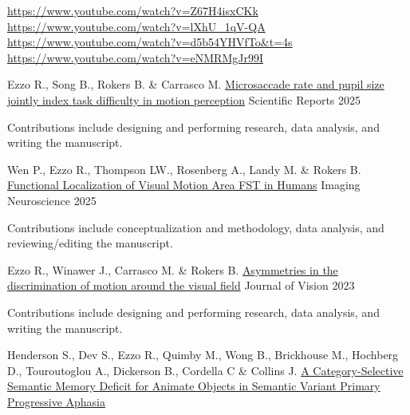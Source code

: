 \newpage
\urldef{\urltoaaic}\url{https://www.youtube.com/watch?v=Z67H4isxCKk}
\urldef{\urltocns}\url{https://www.youtube.com/watch?v=lXhU_1qV-QA}
\urldef{\urltoecvp}\url{https://www.youtube.com/watch?v=d5b54YHVfTo&t=4s}
\urldef{\urltovss}\url{https://www.youtube.com/watch?v=eNMRMgJr99I}
\begin{cventries}
  \cventry
    {Ezzo R., Song B., Rokers B. \& Carrasco M.}
    {\href{https://www.nature.com/articles/s41598-025-04748-0}{Microsaccade rate and pupil size jointly index task difficulty in motion perception}}
    {Scientific Reports}
    {2025}
    {
      \begin{cvitems}
        \item {Contributions include designing and performing research, data analysis, and writing the manuscript.}
      \end{cvitems}
    }
\cventry
    {Wen P., Ezzo R., Thompson LW., Rosenberg A., Landy M. \& Rokers B.}
    {\href{https://pmc.ncbi.nlm.nih.gov/articles/PMC11430136}{Functional Localization of Visual Motion Area FST in Humans}}
    {Imaging Neuroscience}
    {2025}
    {
      \begin{cvitems}
        \item {Contributions include conceptualization and methodology, data analysis, and reviewing/editing the manuscript.}
      \end{cvitems}
    }
  \cventry
    {Ezzo R., Winawer J., Carrasco M.  \& Rokers B.}
    {\href{https://jov.arvojournals.org/article.aspx?articleid=2785488}{Asymmetries in the discrimination of motion around the visual field}}
    {Journal of Vision}
    {2023}
    {
      \begin{cvitems}
        \item {Contributions include designing and performing research, data analysis, and writing the manuscript.}
      \end{cvitems}
    }
  \cventry
    {Henderson S., Dev S., Ezzo R., Quimby M., Wong B., Brickhouse M., Hochberg D., Touroutoglou A., Dickerson B., Cordella C  \& Collins J.}
    {\href{https://academic.oup.com/braincomms/advance-article/doi/10.1093/braincomms/fcab210/6370144?login=true}{A Category-Selective Semantic Memory Deficit for Animate Objects in Semantic Variant Primary Progressive Aphasia}}

\end{cventries}

